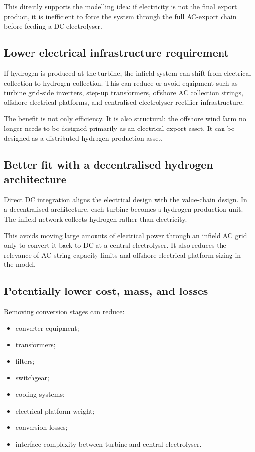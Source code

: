 \documentclass[
  letterpaper,
  DIV=11,
  numbers=noendperiod]{scrartcl}
\providecommand{\tightlist}{%
  \setlength{\itemsep}{0pt}\setlength{\parskip}{0pt}}
\begin{document}
This directly supports the modelling idea: if electricity is not the
final export product, it is inefficient to force the system through the
full AC-export chain before feeding a DC electrolyser.

\subsection{Lower electrical infrastructure
requirement}\label{lower-electrical-infrastructure-requirement}

If hydrogen is produced at the turbine, the infield system can shift
from electrical collection to hydrogen collection. This can reduce or
avoid equipment such as turbine grid-side inverters, step-up
transformers, offshore AC collection strings, offshore electrical
platforms, and centralised electrolyser rectifier infrastructure.

The benefit is not only efficiency. It is also structural: the offshore
wind farm no longer needs to be designed primarily as an electrical
export asset. It can be designed as a distributed hydrogen-production
asset.

\subsection{Better fit with a decentralised hydrogen
architecture}\label{better-fit-with-a-decentralised-hydrogen-architecture}

Direct DC integration aligns the electrical design with the value-chain
design. In a decentralised architecture, each turbine becomes a
hydrogen-production unit. The infield network collects hydrogen rather
than electricity.

This avoids moving large amounts of electrical power through an infield
AC grid only to convert it back to DC at a central electrolyser. It also
reduces the relevance of AC string capacity limits and offshore
electrical platform sizing in the model.

\subsection{Potentially lower cost, mass, and
losses}\label{potentially-lower-cost-mass-and-losses}

Removing conversion stages can reduce:

\begin{itemize}
\tightlist
\item
  converter equipment;
\item
  transformers;
\item
  filters;
\item
  switchgear;
\item
  cooling systems;
\item
  electrical platform weight;
\item
  conversion losses;
\item
  interface complexity between turbine and central electrolyser.
\end{itemize}
\end{document}
